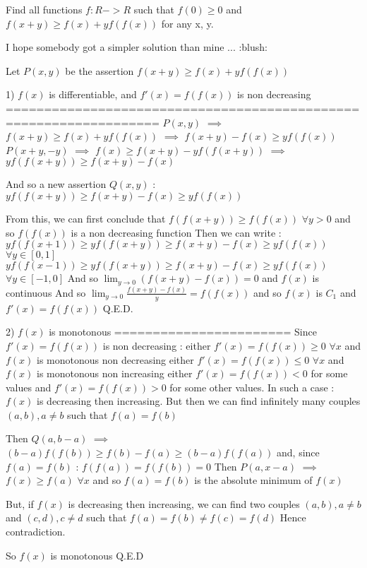 \begin{solution}
	\begin{tcolorbox}Find all functions $ f: R - > R$ such that $ f(0) \ge 0$ and
$ f(x + y) \ge f(x) + yf(f(x))$
for any x, y.\end{tcolorbox}
I hope somebody got a simpler solution than mine ...  :blush: 

Let $ P(x,y)$ be the assertion $ f(x+y)\geq f(x)+yf(f(x))$

1) $ f(x)$ is differentiable, and $ f'(x)=f(f(x))$ is non decreasing
==================================================================
$ P(x,y)$ $ \implies$ $ f(x+y)\geq f(x)+yf(f(x))$ $ \implies$ $ f(x+y)-f(x)\geq yf(f(x))$
$ P(x+y,-y)$ $ \implies$ $ f(x)\geq f(x+y)-yf(f(x+y))$ $ \implies$ $ yf(f(x+y))\geq f(x+y)-f(x)$

And so a new assertion $ Q(x,y)$ : $ yf(f(x+y))\geq f(x+y)-f(x)\geq yf(f(x))$

From this, we can first conclude that $ f(f(x+y))\geq f(f(x))$ $ \forall y>0$ and so $ f(f(x))$ is a non decreasing function
Then we can write :
$ yf(f(x+1))\geq yf(f(x+y))\geq f(x+y)-f(x)\geq yf(f(x))$ $ \forall y\in[0,1]$
$ yf(f(x-1))\geq yf(f(x+y))\geq f(x+y)-f(x)\geq yf(f(x))$ $ \forall y\in[-1,0]$
And so $ \lim_{y\to 0}(f(x+y)-f(x))=0$ and $ f(x)$ is continuous
And so $ \lim_{y\to 0}\frac{f(x+y)-f(x)}y=f(f(x))$ and so $ f(x)$ is $ C_1$ and $ f'(x)=f(f(x))$
Q.E.D.

2) $ f(x)$ is monotonous
=======================
Since $ f'(x)=f(f(x))$ is non decreasing :
either $ f'(x)=f(f(x))\geq 0$ $ \forall x$ and $ f(x)$ is monotonous non decreasing
either $ f'(x)=f(f(x))\leq 0$ $ \forall x$ and $ f(x)$ is monotonous non increasing
either $ f'(x)=f(f(x))<0$ for some values and $ f'(x)=f(f(x))>0$ for some other values. In such a case :
$ f(x)$ is decreasing then increasing. But then we can find infinitely many couples $ (a,b),a\ne b$ such that $ f(a)=f(b)$

Then $ Q(a,b-a)$ $ \implies$ $ (b-a)f(f(b))\geq f(b)-f(a)\geq (b-a)f(f(a))$ and, since $ f(a)=f(b)$ : $ f(f(a))=f(f(b))=0$
Then $ P(a,x-a)$ $ \implies$ $ f(x)\geq f(a)$ $ \forall x$ and so $ f(a)=f(b)$ is the absolute minimum of $ f(x)$

But, if $ f(x)$ is decreasing then increasing, we can find two couples $ (a,b),a\ne b$ and $ (c,d),c\ne d$ such that $ f(a)=f(b)\ne f(c)=f(d)$ Hence contradiction.

So $ f(x)$ is monotonous
Q.E.D


\end{solution}
